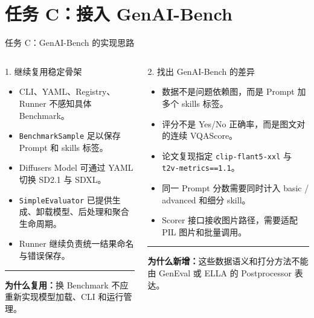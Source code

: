 \documentclass[aspectratio=169,10pt]{beamer}
\begin{document}
\section{任务 C：接入 GenAI-Bench}
\begin{frame}{任务 C：GenAI-Bench 的实现思路}
  \begin{columns}[T,onlytextwidth]
      \begin{block}{1. 继续复用稳定骨架}
        \begin{minipage}[c][5.05cm][c]{\linewidth}
          \begin{itemize}\scriptsize
            \item CLI、YAML、Registry、Runner 不感知具体 Benchmark。
            \item \texttt{BenchmarkSample} 足以保存 Prompt 和 skills 标签。
            \item Diffusers Model 可通过 YAML 切换 SD2.1 与 SDXL。
            \item \texttt{SimpleEvaluator} 已提供生成、卸载模型、后处理和聚合生命周期。
            \item Runner 继续负责统一结果命名与错误保存。
          \end{itemize}
          \vspace{0.45em}
          \color{T2IGray}\rule{\linewidth}{0.35pt}\par\vspace{0.3em}
          \scriptsize\textbf{为什么复用：}换 Benchmark 不应重新实现模型加载、CLI 和运行管理。
        \end{minipage}
      \end{block}

      \begin{block}{2. 找出 GenAI-Bench 的差异}
        \begin{minipage}[c][5.05cm][c]{\linewidth}
          \begin{itemize}\scriptsize
            \item 数据不是问题依赖图，而是 Prompt 加多个 skills 标签。
            \item 评分不是 Yes/No 正确率，而是图文对的连续 VQAScore。
            \item 论文复现指定 \texttt{clip-flant5-xxl} 与 \texttt{t2v-metrics==1.1}。
            \item 同一 Prompt 分数需要同时计入 basic / advanced 和细分 skill。
            \item Scorer 接口接收图片路径，需要适配 PIL 图片和批量调用。
          \end{itemize}
          \vspace{0.45em}
          \color{T2IGray}\rule{\linewidth}{0.35pt}\par\vspace{0.3em}
          \scriptsize\textbf{为什么新增：}这些数据语义和打分方法不能由 GenEval 或 ELLA 的 Postprocessor 表达。
        \end{minipage}
      \end{block}


\end{columns}
\end{frame}
\end{document}
